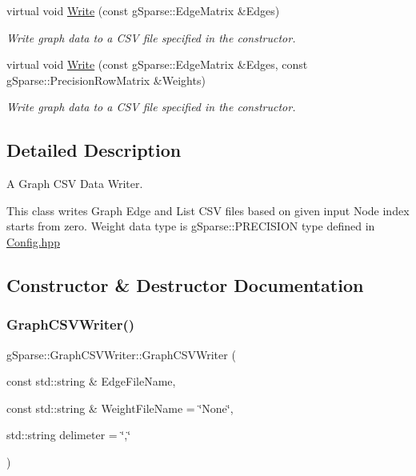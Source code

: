 \begin{DoxyCompactItemize}
virtual void \mbox{\hyperlink{classg_sparse_1_1_graph_c_s_v_writer_a83598d104e12327bf819928239e18ca3}{Write}} (const g\+Sparse\+::\+Edge\+Matrix \&Edges)
\begin{DoxyCompactList}\small\item\em Write graph data to a C\+SV file specified in the constructor. \end{DoxyCompactList}\item 
virtual void \mbox{\hyperlink{classg_sparse_1_1_graph_c_s_v_writer_a66e9fe4e8887abca81d6d0090b217950}{Write}} (const g\+Sparse\+::\+Edge\+Matrix \&Edges, const g\+Sparse\+::\+Precision\+Row\+Matrix \&Weights)
\begin{DoxyCompactList}\small\item\em Write graph data to a C\+SV file specified in the constructor. \end{DoxyCompactList}\end{DoxyCompactItemize}


\subsection{Detailed Description}
A Graph C\+SV Data Writer. 

This class writes Graph Edge and List C\+SV files based on given input Node index starts from zero. Weight data type is g\+Sparse\+::\+P\+R\+E\+C\+I\+S\+I\+ON type defined in \mbox{\hyperlink{_config_8hpp_source}{Config.\+hpp}} 

\subsection{Constructor \& Destructor Documentation}
\mbox{\label{classg_sparse_1_1_graph_c_s_v_writer_aa89f61ce6e6affcbc418f892f0110de9}} 
\subsubsection{\texorpdfstring{Graph\+C\+S\+V\+Writer()}{GraphCSVWriter()}}
{\footnotesize\ttfamily g\+Sparse\+::\+Graph\+C\+S\+V\+Writer\+::\+Graph\+C\+S\+V\+Writer (\begin{DoxyParamCaption}\item[{const std\+::string \&}]{Edge\+File\+Name,  }\item[{const std\+::string \&}]{Weight\+File\+Name = {\ttfamily \char`\"{}None\char`\"{}},  }\item[{std\+::string}]{delimeter = {\ttfamily \char`\"{},\char`\"{}} }\end{DoxyParamCaption})\hspace{0.3cm}{\ttfamily [inline]}}



